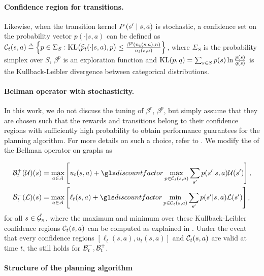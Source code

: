 \paragraph{Confidence region for transitions.}

Likewise, when the transition kernel $P\left(s' \;\middle|\; s,a\right)$ is stochastic, a confidence set on the probability vector $p(\cdot|s,a)$ can be defined as
$\cC_t(s,a) \eqdef \left\{p\in \Sigma_S :  \KL\!\big(\hp_t(\cdot|s,a),p\big) \leq \frac {\beta^p(n_t(s,a), n)} {n_t(s,a)}\right\}$,
where $\Sigma_S$ is the probability simplex over $S$, $\beta^p$ is an exploration function and $\operatorname{KL}(p,q)= \sum_{s \in S}  p(s) \ln \tfrac{ p(s)} {{q}(s)}$ is the Kullback-Leibler divergence between categorical distributions.

\paragraph{Bellman operator with stochasticity.}

In this work, we do not discuss the tuning of $\beta^r$, $\beta^p$, but simply assume that they are chosen such that the rewards and transitions belong to their confidence regions with sufficiently high probability to obtain performance guarantees for the  planning algorithm. For more details on such a choice, refer to \citep[e.g.][]{Leurent2019practical, MDPGapE2020}. We modify the  of the Bellman operator on graphs as

\begin{align*}
\cB_t^+(\cU)(s) &= \max_{a\in A} \left[u_t(s,a) + \discount \max_{p \in \cC_t(s,a)} \sum_{s'} p(s'|s,a) \cU(s')\right], \\
\cB_t^-(\cL)(s) &= \max_{a\in A} \left[\ell_t(s,a) + \discount \min_{p \in \cC_t(s,a)} \sum_{s'} p(s'|s,a)\cL(s')\right],
\end{align*}
for all $s\in\mathring{\mathcal{G}_n}$, where the maximum and minimum over these Kullback-Leibler confidence regions $\mathcal{C}_t(s,a)$ can be computed as explained in \citep[Appendix A of][]{Filippi2010optimism}. Under the event that every confidence regions $[\ell_t(s,a), u_t(s,a)]$ and $\mathcal{C}_t(s,a)$ are valid at time $t$, the  still holds for $\mathcal{B}_t^-, \mathcal{B}_t^+$.

\paragraph{Structure of the planning algorithm}

